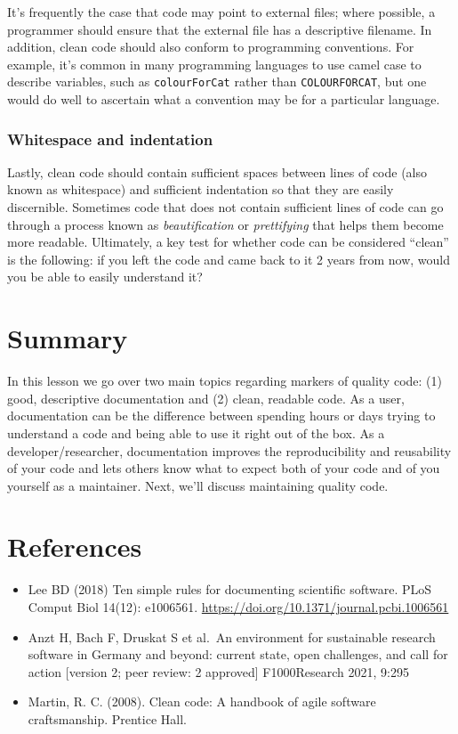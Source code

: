 \documentclass[
  letterpaper,
  DIV=11,
  numbers=noendperiod]{scrreport}
\providecommand{\tightlist}{%
  \setlength{\itemsep}{0pt}\setlength{\parskip}{0pt}}\usepackage{longtable,booktabs,array}
\begin{document}
It's frequently the case that code may point to external files; where
possible, a programmer should ensure that the external file has a
descriptive filename. In addition, clean code should also conform to
programming conventions. For example, it's common in many programming
languages to use camel case to describe variables, such as
\texttt{colourForCat} rather than \texttt{COLOURFORCAT}, but one would
do well to ascertain what a convention may be for a particular language.

\hypertarget{whitespace-and-indentation}{%
\subsubsection{Whitespace and
indentation}\label{whitespace-and-indentation}}

Lastly, clean code should contain sufficient spaces between lines of
code (also known as whitespace) and sufficient indentation so that they
are easily discernible. Sometimes code that does not contain sufficient
lines of code can go through a process known as \emph{beautification} or
\emph{prettifying} that helps them become more readable. Ultimately, a
key test for whether code can be considered ``clean'' is the following:
if you left the code and came back to it 2 years from now, would you be
able to easily understand it?

\hypertarget{summary-6}{%
\section{Summary}\label{summary-6}}

In this lesson we go over two main topics regarding markers of quality
code: (1) good, descriptive documentation and (2) clean, readable code.
As a user, documentation can be the difference between spending hours or
days trying to understand a code and being able to use it right out of
the box. As a developer/researcher, documentation improves the
reproducibility and reusability of your code and lets others know what
to expect both of your code and of you yourself as a maintainer. Next,
we'll discuss maintaining quality code.

\hypertarget{references-1}{%
\section{References}\label{references-1}}

\begin{itemize}
\tightlist
\item
  Lee BD (2018) Ten simple rules for documenting scientific software.
  PLoS Comput Biol 14(12): e1006561.
  \url{https://doi.org/10.1371/journal.pcbi.1006561}
\item
  Anzt H, Bach F, Druskat S et al.~An environment for sustainable
  research software in Germany and beyond: current state, open
  challenges, and call for action {[}version 2; peer review: 2
  approved{]} F1000Research 2021, 9:295
\item
  Martin, R. C. (2008). Clean code: A handbook of agile software
  craftsmanship. Prentice Hall.
\end{itemize}
\end{document}
